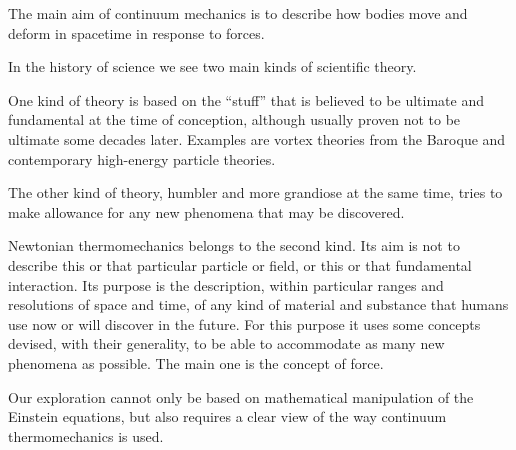 \documentclass[\ifafour a4paper,12pt,\else a5paper,10pt,\fi%
onecolumn,oneside,article,%
british%
]{memoir}
\theoremstyle{remark}
\theoremstyle{innote}
\renewcommand*{\|}[1][]{\nonscript\,#1\vert\nonscript\;\mathopen{}}
\begin{document}
The main aim of continuum mechanics is to describe how bodies move and
deform in spacetime in response to forces. 

In the history of science we see two main kinds of scientific theory.

One kind of theory is based on the \enquote{stuff} that is believed to be
ultimate and fundamental at the time of conception, although usually proven
not to be ultimate some decades later. Examples are vortex theories from
the Baroque and contemporary high-energy particle theories.

The other kind of theory, humbler and more grandiose at the same time,
tries to make allowance for any new phenomena that may be discovered.

Newtonian thermomechanics belongs to the second kind. Its aim is not to
describe this or that particular particle or field, or this or that
fundamental interaction. Its purpose is the description, within particular
ranges and resolutions of space and time, of any kind of material and
substance that humans use now or will discover in the future. For this
purpose it uses some concepts devised, with their generality, to be able to
accommodate as many new phenomena as possible. The main one is the concept
of force.

Our exploration cannot only be based on mathematical manipulation of the
Einstein equations, but also requires a clear view of the way continuum
thermomechanics is used. %
\end{document}
